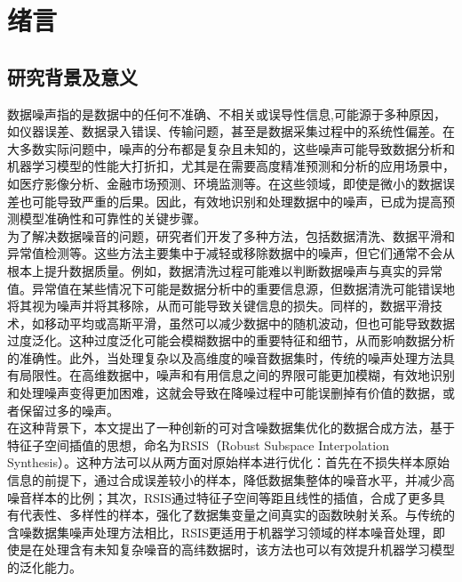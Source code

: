 \documentclass{NauThesis}
\begin{document}
\TableOfContents

\mainpagestyle
\setcounter{page}{1}

\chapter{绪言}

\section{研究背景及意义}
数据噪声指的是数据中的任何不准确、不相关或误导性信息,可能源于多种原因，如仪器误差、数据录入错误、传输问题，甚至是数据采集过程中的系统性偏差\cite{ref1,ref2}。在大多数实际问题中，噪声的分布都是复杂且未知的，这些噪声可能导致数据分析和机器学习模型的性能大打折扣，尤其是在需要高度精准预测和分析的应用场景中，如医疗影像分析、金融市场预测、环境监测等\cite{ref4,ref5,ref6}。在这些领域，即使是微小的数据误差也可能导致严重的后果。因此，有效地识别和处理数据中的噪声，已成为提高预测模型准确性和可靠性的关键步骤。
\\\hspace*{2em}为了解决数据噪音的问题，研究者们开发了多种方法，包括数据清洗\cite{ref7,ref8}、数据平滑\cite{ref9,ref10,ref11}和异常值检测\cite{ref12,ref13}等。这些方法主要集中于减轻或移除数据中的噪声，但它们通常不会从根本上提升数据质量。例如，数据清洗过程可能难以判断数据噪声与真实的异常值。异常值在某些情况下可能是数据分析中的重要信息源，但数据清洗可能错误地将其视为噪声并将其移除，从而可能导致关键信息的损失\cite{ref14}。同样的，数据平滑技术，如移动平均或高斯平滑，虽然可以减少数据中的随机波动，但也可能导致数据过度泛化。这种过度泛化可能会模糊数据中的重要特征和细节，从而影响数据分析的准确性\cite{ref15}。此外，当处理复杂以及高维度的噪音数据集时，传统的噪声处理方法具有局限性。在高维数据中，噪声和有用信息之间的界限可能更加模糊，有效地识别和处理噪声变得更加困难，这就会导致在降噪过程中可能误删掉有价值的数据，或者保留过多的噪声。
\\\hspace*{2em}在这种背景下，本文提出了一种创新的可对含噪数据集优化的数据合成方法，基于特征子空间插值的思想，命名为RSIS（Robust Subspace Interpolation Synthesis）。这种方法可以从两方面对原始样本进行优化：首先在不损失样本原始信息的前提下，通过合成误差较小的样本，降低数据集整体的噪音水平，并减少高噪音样本的比例；其次，RSIS通过特征子空间等距且线性的插值，合成了更多具有代表性、多样性的样本，强化了数据集变量之间真实的函数映射关系。与传统的含噪数据集噪声处理方法相比，RSIS更适用于机器学习领域的样本噪音处理，即使是在处理含有未知复杂噪音的高纬数据时，该方法也可以有效提升机器学习模型的泛化能力。
\end{document}
